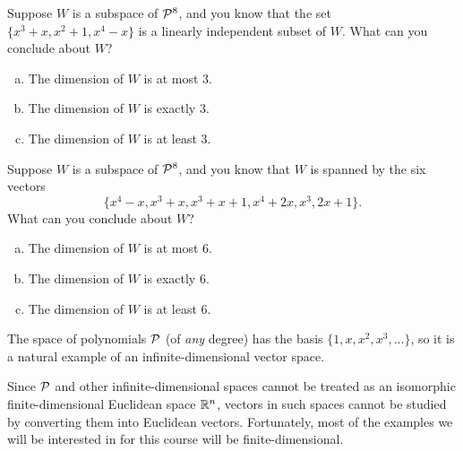 \begin{activity}{5}
Suppose \(W\) is a subspace of \(\P^8\), and you know that
 the set \(\{ x^3+x, x^2+1, x^4-x \}\) is a linearly independent subset of \(W\).
What can you conclude about \(W\)?
\begin{enumerate}[(a)]
\item The dimension of \(W\) is at most 3.
\item The dimension of \(W\) is exactly 3.
\item The dimension of \(W\) is at least 3.
\end{enumerate}
\end{activity}

\begin{activity}{5}
Suppose \(W\) is a subspace of \(\P^8\), and you know that
 \(W\) is spanned by the six vectors \[\{ x^4-x,x^3+x,x^3+x+1,x^4+2x,x^3,2x+1\}.\]
What can you conclude about \(W\)?
\begin{enumerate}[(a)]
\item The dimension of \(W\) is at most 6.
\item The dimension of \(W\) is exactly 6.
\item The dimension of \(W\) is at least 6.
\end{enumerate}
\end{activity}

\begin{observation}
  The space of polynomials \(\P\) (of \textit{any} degree)
  has the basis \(\{1,x,x^2,x^3,\dots\}\),
  so it is a natural example of an infinite-dimensional vector space.

  \vspace{1em}

  Since \(\P\) and other infinite-dimensional spaces cannot be treated as
  an isomorphic finite-dimensional Euclidean space \(\IR^n\), vectors in
  such spaces cannot be studied by converting them into Euclidean vectors.
  Fortunately, most of the examples we will be
  interested in for this course will be finite-dimensional.
\end{observation}

